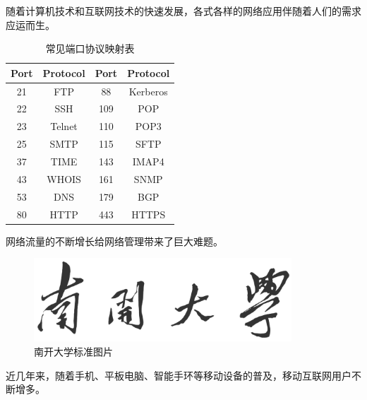 随着计算机技术和互联网技术的快速发展\cite{Nadkarni-1992}，各式各样的网络应用伴随着人们的需求应运而生\cite{Hua-Wang-1973}。

\begin{table} [thb]
	\caption{常见端口协议映射表}\label{tab:21}
	\small
	\centering
	{
		\begin{tabular}{cccc}
			\toprule
			Port & Protocol & Port & Protocol\\
			\midrule
			21 & FTP & 88 & Kerberos\\
			22 & SSH & 109 & POP\\
			23 & Telnet & 110 & POP3\\
			25 & SMTP & 115 & SFTP\\
			37 & TIME & 143 & IMAP4\\
			43 & WHOIS & 161 & SNMP\\
			53 & DNS & 179 & BGP\\
			80 & HTTP & 443 & HTTPS\\
			
			\bottomrule
		\end{tabular}
	}
\end{table}

网络流量的不断增长给网络管理带来了巨大难题。

\begin{figure}[htb]
\centering
\includegraphics[width=3.8in]{./figures/0/nankaidaxue}
\caption{南开大学标准图片}
\label{fig:11}
\end{figure}

近几年来，随着手机、平板电脑、智能手环等移动设备的普及\supercite{bahl2000radar}，移动互联网用户不断增多\supercite{monkey}。